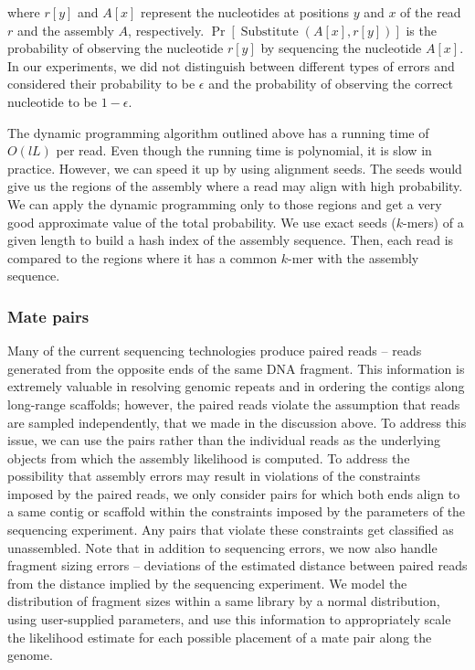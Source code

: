 \documentclass[12pt,\mydriver]{thesis}
\begin{document}
\noindent where $r[y]$ and $A[x]$ represent the nucleotides at positions $y$ and
$x$ of the read $r$ and the assembly $A$, respectively.
$\Pr[\operatorname{Substitute}(A[x], r[y])]$ is the probability of
observing the nucleotide $r[y]$ by sequencing the nucleotide $A[x]$.
In our experiments, we did not distinguish between
different types of errors and considered their probability to be
$\epsilon$ and the probability of observing the correct nucleotide to
be $1 - \epsilon$.

The dynamic programming algorithm outlined above has a running time of
$O(lL)$ per read.  Even though the running time is polynomial, it is
slow in practice.  However, we can speed it up by using alignment
seeds.  The seeds would give us the regions of the assembly where a
read may align with high probability.  We can apply the dynamic
programming only to those regions and get a very good approximate
value of the total probability.  We use exact seeds ($k$-mers) of a
given length to build a hash index of the assembly sequence.  Then,
each read is compared to the regions where it has a common $k$-mer
with the assembly sequence.

\subsubsection{Mate pairs}
Many of the current sequencing technologies produce paired reads --
reads generated from the opposite ends of the same DNA fragment.  This
information is extremely valuable in resolving genomic repeats and in
ordering the contigs along long-range scaffolds; however, the paired
reads violate the assumption that reads are sampled independently,
that we made in the discussion above.  To address this issue, we can use the
pairs rather than the individual reads as the underlying objects from
which the assembly likelihood is computed.  To address the possibility
that assembly errors may result in violations of the constraints imposed by
the paired reads, we only consider pairs for which both ends align to
a same contig or scaffold within the constraints imposed by the
parameters of the sequencing experiment.  Any pairs that violate these
constraints get classified as unassembled.  Note that in addition to
sequencing errors, we now also handle fragment sizing errors --
deviations of the estimated distance between paired reads from the
distance implied by the sequencing experiment.  We model the
distribution of fragment sizes within a same library by a normal
distribution, using user-supplied parameters, and use this information
to appropriately scale the likelihood estimate for each possible
placement of a mate pair along the genome.
\end{document}
